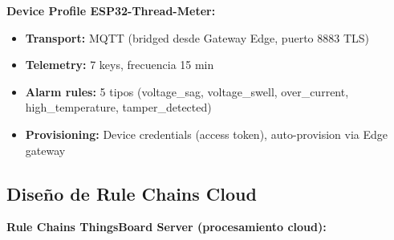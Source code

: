 \textbf{Device Profile ESP32-Thread-Meter:}

\begin{itemize}
    \item \textbf{Transport:} MQTT (bridged desde Gateway Edge, puerto 8883 TLS)
    \item \textbf{Telemetry:} 7 keys, frecuencia 15 min
    \item \textbf{Alarm rules:} 5 tipos (voltage\_sag, voltage\_swell, over\_current, high\_temperature, tamper\_detected)
    \item \textbf{Provisioning:} Device credentials (access token), auto-provision via Edge gateway
\end{itemize}

\subsection{Diseño de Rule Chains Cloud}
\label{sec:server-rule-chains}

\textbf{Rule Chains ThingsBoard Server (procesamiento cloud):}

